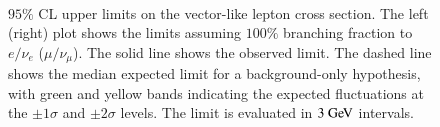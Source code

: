 \begin{figure}[htbp]
  \centering	
   \\
  \caption{$95 \%$ CL upper limits on the vector-like lepton cross section. The left (right) plot shows the limits assuming $100\%$ branching fraction to $e/\nu_e$ ($\mu/\nu_{\mu}$). The solid line shows the observed limit. The dashed line shows the median expected limit for a background-only hypothesis, with green and yellow bands indicating the expected fluctuations at the $\pm1\sigma$ and $\pm 2 \sigma$ levels. The limit is evaluated in $3 \GeV$ intervals.}
  \label{fig:VLLLimit}
\end{figure}

